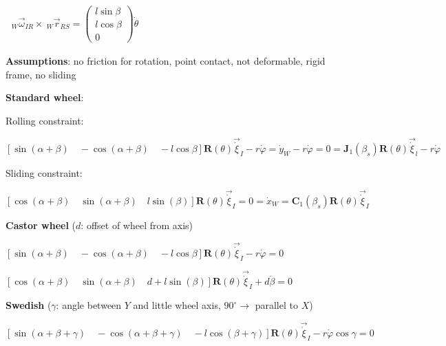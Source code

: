 \documentclass[fontsize=6pt]{scrartcl}
\newcommand{\mat}[1]{\mathbf{#1}}
\begin{document}
\begin{multicols*}{4}
\begin{minipage}{0.73\linewidth}
$
\begin{aligned}
~_W\vec\omega_{IR} \times ~_W\vec{r}_{RS}
=
\begin{pmatrix}
l\sin\beta \\ l \cos\beta\\ 0
\end{pmatrix}
\dot\theta
\end{aligned}
$

\textbf{Assumptions}: no friction for rotation, point contact, not deformable, rigid frame, no sliding
\end{minipage}


\textbf{Standard wheel}:

Rolling constraint:

$\left[\sin(\alpha + \beta) \quad -\cos(\alpha + \beta) \quad -l\cos\beta\right] \mat R(\theta) \vec\dot{\xi}_I - r\dot{\varphi} = \dot y_W - r \dot{\varphi} = 0 = \mat J_1(\beta_s)\mat R(\theta) \vec\dot{\xi}_l - r\dot{\varphi}$

Sliding constraint:

$ \left[ \cos(\alpha + \beta) \quad \sin(\alpha + \beta) \quad l\sin(\beta)\right] \mat R(\theta) \vec\dot{\xi}_I = 0 = \dot{x}_W = \mat C_1(\beta_s) \mat R(\theta) \vec\dot{\xi}_I$


\textbf{Castor wheel} ($d$: offset of wheel from axis)

$ \left[\sin(\alpha + \beta) \quad -\cos(\alpha + \beta) \quad -l\cos\beta\right]\mat R(\theta) \vec\dot{\xi}_I - r\dot{\varphi} = 0$

$ \left[ \cos(\alpha + \beta) \quad \sin(\alpha + \beta) \quad d+l\sin(\beta)\right]\mat R(\theta) \vec\dot{\xi}_I + d\dot{\beta}= 0$

\textbf{Swedish} ($\gamma$: angle between $Y$ and little wheel axis, $90^{\circ} \rightarrow$ parallel to $X$)

$ \left[\sin(\alpha + \beta + \gamma) \quad -\cos(\alpha + \beta + \gamma) \quad -l\cos(\beta+\gamma)\right]\mat R(\theta) \vec\dot{\xi}_I - r\dot{\varphi}\cos\gamma = 0$


\end{multicols*}
\end{document}
